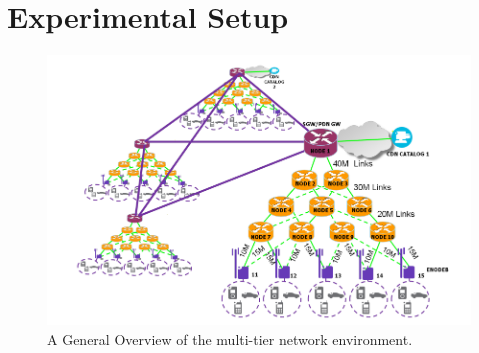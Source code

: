 \section{Experimental Setup}
\label{sec:experimental-setup}

\begin{figure}[htb!]
    \centering
    \includegraphics[width=\linewidth]{images/scenario.png}
    \caption{A General Overview of the multi-tier network environment.}
    \label{fig:multi-tier-network}
\end{figure}